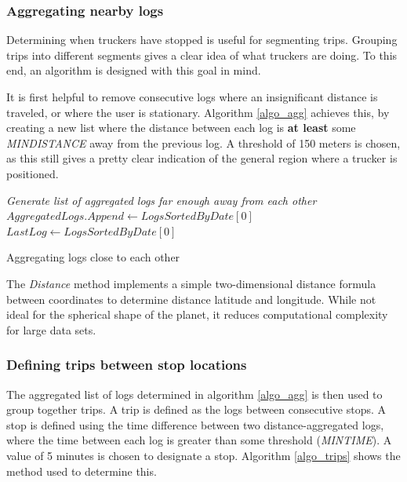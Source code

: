 \subsubsection{Aggregating nearby logs}
Determining when truckers have stopped is useful for segmenting trips.
Grouping trips into different segments gives a clear idea of what truckers are doing.
To this end, an algorithm is designed with this goal in mind.

It is first helpful to remove consecutive logs where an insignificant distance is traveled, or where the user is stationary.
Algorithm \ref{algo_agg} achieves this, by creating a new list where the distance between each log is \textbf{at least} some \textit{MINDISTANCE} away from the previous log. A threshold of 150 meters is chosen, as this still gives a pretty clear indication of the general region where a trucker is positioned.


\begin{algorithm}

\BlankLine
\emph{Generate list of aggregated logs far enough away from each other}\;
$AggregatedLogs.Append \gets LogsSortedByDate[0]$\;
$LastLog \gets LogsSortedByDate[0]$\;
\caption{Aggregating logs close to each other}\label{algo_agg}
\end{algorithm}\DecMargin{1em} 

The \textit{Distance} method implements a simple two-dimensional distance formula between coordinates to determine distance latitude and longitude.
While not ideal for the spherical shape of the planet, it reduces computational complexity for large data sets.

\subsubsection{Defining trips between stop locations}
The aggregated list of logs determined in algorithm \ref{algo_agg} is then used to group together trips.
A trip is defined as the logs between consecutive stops.
A stop is defined using the time difference between two distance-aggregated logs, where the time between each log is greater than some threshold (\textit{MINTIME}).
A value of 5 minutes is chosen to designate a stop.
Algorithm \ref{algo_trips} shows the method used to determine this.

